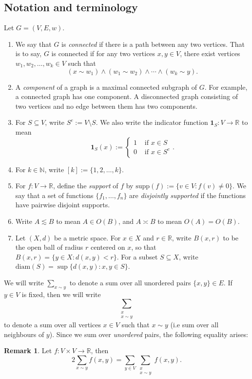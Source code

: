 \documentclass[a4paper,11pt]{article}
\theoremstyle{definition}
\newtheorem{remark}[theorem]{Remark}
\newcommand{\R}{\mathbb{R}}
\newcommand{\supp}[1]{\mathrm{supp}\left(#1\right)}
\newcommand{\diam}[1]{\mathrm{diam}\left(#1\right)}
\begin{document}
\subsection*{Notation and terminology}
Let $G = (V, E, w)$.
\begin{enumerate}
\item We say that $G$ is \emph{connected} if there is a path between any two vertices. That is to say, $G$ is connected if for any two vertices $x, y \in V$, there exist vertices $w_1, w_2, \dots, w_k \in V$ such that \[(x \sim w_1) \wedge (w_1 \sim w_2) \wedge \cdots \wedge (w_k \sim y).\]
\item A \emph{component} of a graph is a maximal connected subgraph of $G$. For example, a connected graph has one component. A disconnected graph consisting of two vertices and no edge between them has two components.
\item For $S \subseteq V$, write $S^c := V \setminus{S}$. We also write the indicator function $\bm{1}_S: V \to \R$ to mean \[
\bm{1}_S(x) := \begin{cases} 1 & \text{ if } x \in S \\ 0 &\text { if } x \in S^c \end{cases}.
\]
\item For $k \in \mathbb{N}$, write $[k] := \{1, 2, \dots, k\}$.
\item For $f: V \to \R$, define the \emph{support} of $f$ by $\supp{f} := \{ v \in V : f(v) \ne 0 \}$. We say that a set of functions $\{f_1, \dots, f_n\}$ are \emph{disjointly supported} if the functions have pairwise disjoint supports.
\item Write $A \lesssim B$ to mean $A \in O(B)$, and $A \asymp B$ to mean $O(A) = O(B)$.
\item Let $(X, d)$ be a metric space. For $x \in X$ and $r \in \R$, write $B(x, r)$ to be the open ball of radius $r$ centered on $x$, so that $B(x, r) = \{ y \in X : d(x, y) < r \}$. For a subset $S \subseteq X$, write $\diam{S} = \sup \{d(x,y) : x,y \in S \}$.
\end{enumerate}

We will write $\sum_{x \sim y}$ to denote a sum over all unordered pairs $\{x, y\} \in E$. If $y \in V$ is fixed, then we will write \[\sum_{\substack{x \\ x \sim y}}\] to denote a sum over all vertices $x \in V$ such that $x \sim y$ (i.e sum over all neighbours of $y$). Since we sum over \emph{unordered} pairs, the following equality arises:

\begin{remark}\label{double-sum}
Let $f : V \times V \to \R$, then
\[
2\sum_{x \sim y} f(x, y) = \sum_{y \in V} \sum_{\substack{x \\ x \sim y}} f(x, y).
\]
\end{remark}
\end{document}
